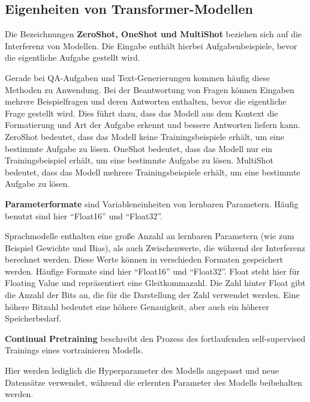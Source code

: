 \subsection{Eigenheiten von Transformer-Modellen}
\begin{definition}\label{def:zeroshot-oneshot-multishot}
    Die Bezeichnungen \textbf{ZeroShot, OneShot und MultiShot} beziehen sich auf die Interferenz von Modellen.
    Die Eingabe enthält hierbei Aufgabenbeispiele, bevor die eigentliche Aufgabe gestellt wird.
\end{definition}
Gerade bei \ac{QA}-Aufgaben und Text-Generierungen kommen häufig diese Methoden zu Anwendung.
Bei der Beantwortung von Fragen können Eingaben mehrere Beispielfragen und deren Antworten enthalten, bevor die eigentliche Frage gestellt wird.
Dies führt dazu, dass das Modell aus dem Kontext die Formatierung und Art der Aufgabe erkennt und bessere Antworten liefern kann.
ZeroShot bedeutet, dass das Modell keine Trainingsbeispiele erhält, um eine bestimmte Aufgabe zu lösen.
OneShot bedeutet, dass das Modell nur ein Trainingsbeispiel erhält, um eine bestimmte Aufgabe zu lösen.
MultiShot bedeutet, dass das Modell mehrere Trainingsbeispiele erhält, um eine bestimmte Aufgabe zu lösen.


\begin{definition}\label{def:parameterformate}
    \textbf{Parameterformate} sind Variableneinheiten von lernbaren Parametern.
    Häufig benutzt sind hier \enquote{Float16} und \enquote{Float32}.
\end{definition}
Sprachmodelle enthalten eine große Anzahl an lernbaren Parametern (wie zum Beispiel Gewichte und Bias),
als auch Zwischenwerte, die während der Interferenz berechnet werden.
Diese Werte können in verschieden Formaten gespeichert werden.
Häufige Formate sind hier \enquote{Float16} und \enquote{Float32}.
Float steht hier für Floating Value und repräsentiert eine Gleitkommazahl.
Die Zahl hinter Float gibt die Anzahl der Bits an, die für die Darstellung der Zahl verwendet werden.
Eine höhere Bitzahl bedeutet eine höhere Genauigkeit, aber auch ein höherer Speicherbedarf.

\begin{definition}\label{def:continual-pretraining}
    \textbf{Continual Pretraining} beschreibt den Prozess des fortlaufenden self-supervised Trainings eines vortrainieren Modells.
\end{definition}
Hier werden lediglich die Hyperparameter des Modells angepasst und neue Datensätze verwendet, während die erlernten Parameter des Modells beibehalten werden.

